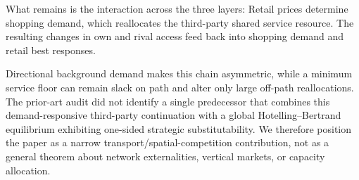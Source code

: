 What remains is the interaction across the three layers:
Retail prices determine shopping demand, which reallocates the third-party shared service resource. The resulting changes in own and rival access feed back into shopping demand and retail best responses.

Directional background demand makes this chain asymmetric, while a minimum service floor can remain slack on path and alter only large off-path reallocations. The prior-art audit did not identify a single predecessor that combines this demand-responsive third-party continuation with a global Hotelling--Bertrand equilibrium exhibiting one-sided strategic substitutability. We therefore position the paper as a narrow transport/spatial-competition contribution, not as a general theorem about network externalities, vertical markets, or capacity allocation.
